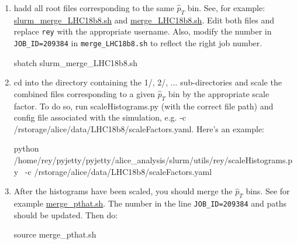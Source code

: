 \documentclass[12pt]{article}
\begin{document}
\begin{enumerate}
\item hadd all root files corresponding to the same $\hat{p}_T$ bin.
See, for example: \href{https://github.com/reynier0611/pyjetty/blob/master/pyjetty/alice_analysis/slurm/utils/rey/slurm_merge_LHC18b8.sh}{slurm\_merge\_LHC18b8.sh} and
\href{https://github.com/reynier0611/pyjetty/blob/master/pyjetty/alice_analysis/slurm/utils/rey/merge_LHC18b8.sh}{merge\_LHC18b8.sh}.
Edit both files and replace \verb|rey| with the appropriate username. Also, modify the number in \verb|JOB_ID=209384| in \verb|merge_LHC18b8.sh| to reflect the right job number.

\begin{tcolorbox}
\begin{verbnobox}[\scriptsize]
sbatch slurm_merge_LHC18b8.sh
\end{verbnobox}  
\end{tcolorbox}

\item cd into the directory containing the 1/, 2/, ... sub-directories and scale the combined files corresponding to a given $\hat{p}_T$ bin by the appropriate scale factor.
To do so, run scaleHistograms.py (with the correct file path) and config file associated with the simulation, e.g. -c /rstorage/alice/data/LHC18b8/scaleFactors.yaml.
Here's an example:

\begin{tcolorbox}
\begin{verbnobox}[\scriptsize]
python /home/rey/pyjetty/pyjetty/alice_analysis/slurm/utils/rey/scaleHistograms.py \
-c /rstorage/alice/data/LHC18b8/scaleFactors.yaml
\end{verbnobox}  
\end{tcolorbox}

\item After the histograms have been scaled, you should merge the $\hat{p}_T$ bins. See for example \href{https://github.com/reynier0611/pyjetty/blob/master/pyjetty/alice_analysis/slurm/utils/rey/merge_pthat.sh}{merge\_pthat.sh}.
The number in the line \verb|JOB_ID=209384| and paths should be updated. Then do:

\begin{tcolorbox}
\begin{verbnobox}[\scriptsize]
source merge_pthat.sh
\end{verbnobox}  
\end{tcolorbox}

\end{enumerate}
\end{document}
